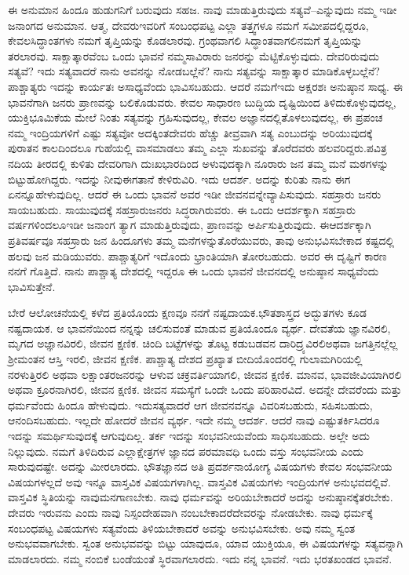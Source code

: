 ಈ ಅನುಮಾನ ಹಿಂದೂ ಹುಡುಗನಿಗೆ ಬರುವುದು ಸಹಜ. ನಾವು ಮಾಡುತ್ತಿರುವುದು ಸತ್ಯವೆ–ಎನ್ನುವುದು ನಮ್ಮ ಇಡೀ ಜನಾಂಗದ ಅನುಮಾನ. ಆತ್ಮ, ದೇವರು\break ಇವರಿಗೆ ಸಂಬಂಧಪಟ್ಟ ಎಲ್ಲಾ ತತ್ತ್ವಗಳೂ ನಮಗೆ ಸಮೀಪದಲ್ಲಿದ್ದರೂ, ಕೇವಲ\break ಸಿದ್ಧಾಂತಗಳು ನಮಗೆ ತೃಪ್ತಿಯನ್ನು ಕೊಡಲಾರವು. ಗ್ರಂಥವಾಗಲಿ ಸಿದ್ಧಾಂತವಾಗಲಿ\break ನಮಗೆ ತೃಪ್ತಿಯನ್ನು ತರಲಾರವು. ಸಾಕ್ಷಾತ್ಕಾರವೆಂಬ ಒಂದು ಭಾವನೆ ನಮ್ಮ\break ಸಾವಿರಾರು ಜನರನ್ನು ಮೆಟ್ಟಿಕೊಳ್ಳುವುದು. ದೇವರಿರುವುದು ಸತ್ಯವೆ? ಇದು ಸತ್ಯವಾದರೆ ನಾನು ಅವನನ್ನು ನೋಡಬಲ್ಲೆನೆ? ನಾನು ಸತ್ಯವನ್ನು ಸಾಕ್ಷಾತ್ಕಾರ ಮಾಡಿಕೊಳ್ಳಬಲ್ಲೆನೆ? ಪಾಶ್ಚಾತ್ಯರು ಇದನ್ನು ಕಾರ್ಯತಃ ಅಸಾಧ್ಯವೆಂದು ಭಾವಿಸಬಹುದು. ಆದರೆ ನಮಗೆ\break ಇದು ಅಕ್ಷರಶಃ ಅನುಷ್ಠಾನ ಸಾಧ್ಯ. ಈ ಭಾವನೆಗಾಗಿ ಜನರು ಪ್ರಾಣವನ್ನು ಬಲಿಕೊಡುವರು. ಕೇವಲ ಸಾಧಾರಣ ಬುದ್ಧಿಯ ದೃಷ್ಟಿಯಿಂದ ತಿಳಿದುಕೊಳ್ಳುವುದಲ್ಲ, ಯುಕ್ತಿ\break ಭೂಮಿಕೆಯ ಮೇಲೆ ನಿಂತು ಸತ್ಯವನ್ನು ಗ್ರಹಿಸುವುದಲ್ಲ, ಕೇವಲ ಅಜ್ಞಾನದಲ್ಲಿ\break ತೊಳಲುವುದಲ್ಲ, ಈ ಪ್ರಪಂಚ ನಮ್ಮ ಇಂದ್ರಿಯಗಳಿಗೆ ಎಷ್ಟು ಸತ್ಯವೋ ಅದಕ್ಕಿಂತ\break ದೇವರು ಹೆಚ್ಚು ತೀವ್ರವಾಗಿ ಸತ್ಯ ಎಂಬುದನ್ನು ಅರಿಯುವುದಕ್ಕೆ ಪುರಾತನ ಕಾಲದಿಂದಲೂ ಗುಹೆಯಲ್ಲಿ ವಾಸಮಾಡಲು ತಮ್ಮ ಎಲ್ಲಾ ಸುಖವನ್ನು ತೊರೆದವರು ಹಲವರಿದ್ದರು.\break ಪವಿತ್ರ ನದಿಯ ತೀರದಲ್ಲಿ ಕುಳಿತು ದೇವರಿಗಾಗಿ ದುಃಖಭಾರದಿಂದ ಅಳುವುದಕ್ಕಾಗಿ ನೂರಾರು ಜನ ತಮ್ಮ ಮನೆ ಮಠಗಳನ್ನು ಬಿಟ್ಟುಹೋಗಿದ್ದರು. ಇದನ್ನು ನೀವು\break ಈಗತಾನೆ ಕೇಳಿರುವಿರಿ. ಇದು ಆದರ್ಶ. ಅದನ್ನು ಕುರಿತು ನಾನು ಈಗ ಏನನ್ನೂ\break ಹೇಳುವುದಿಲ್ಲ. ಆದರೆ ಈ ಒಂದು ಭಾವನೆ ಅವರ ಇಡೀ ಜೀವನವನ್ನೇ\break ವ್ಯಾಪಿಸುವುದು. ಸಹಸ್ರಾರು ಜನರು ಸಾಯಬಹುದು. ಸಾಯುವುದಕ್ಕೆ ಸಹಸ್ರಾರು\break ಜನರು ಸಿದ್ಧರಾಗಿರುವರು. ಈ ಒಂದು ಆದರ್ಶಕ್ಕಾಗಿ ಸಹಸ್ರಾರು ವರ್ಷಗಳಿಂದಲೂ\break ಇಡೀ ಜನಾಂಗ ತ್ಯಾಗ ಮಾಡುತ್ತಿರುವುದು, ಪ್ರಾಣವನ್ನು ಅರ್ಪಿಸುತ್ತಿರುವುದು. ಈ\break ಆದರ್ಶಕ್ಕಾಗಿ ಪ್ರತಿವರ್ಷವೂ ಸಹಸ್ರಾರು ಜನ ಹಿಂದೂಗಳು ತಮ್ಮ ಮನೆಗಳನ್ನು\break ತೊರೆಯುವರು, ತಾವು ಅನುಭವಿಸಬೇಕಾದ ಕಷ್ಟದಲ್ಲಿ ಹಲವು ಜನ ಮಡಿಯುವರು. ಪಾಶ್ಚಾತ್ಯರಿಗೆ ಇದೊಂದು ಭ್ರಾಂತಿಯಾಗಿ ತೋರಬಹುದು. ಅವರ ಈ ದೃಷ್ಟಿಗೆ ಕಾರಣ ನನಗೆ ಗೊತ್ತಿದೆ. ನಾನು ಪಾಶ್ಚಾತ್ಯ ದೇಶದಲ್ಲಿ ಇದ್ದರೂ ಈ ಒಂದು ಭಾವನೆ ಜೀವನದಲ್ಲಿ ಅನುಷ್ಠಾನ ಸಾಧ್ಯವೆಂದು ಭಾವಿಸುತ್ತೇನೆ.

ಬೇರೆ ಆಲೋಚನೆಯಲ್ಲಿ ಕಳೆದ ಪ್ರತಿಯೊಂದು ಕ್ಷಣವೂ ನನಗೆ ನಷ್ಟದಾಯಕ.\break ಭೌತಶಾಸ್ತ್ರದ ಅದ್ಭುತಗಳು ಕೂಡ ನಷ್ಟದಾಯಕ. ಆ ಭಾವನೆಯಿಂದ ನನ್ನನ್ನು ಚಲಿಸುವಂತೆ ಮಾಡುವ ಪ್ರತಿಯೊಂದೂ ವ್ಯರ್ಥ. ದೇವತೆಯ ಜ್ಞಾನವಿರಲಿ, ಮೃಗದ ಅಜ್ಞಾನವಿರಲಿ, ಜೀವನ ಕ್ಷಣಿಕ. ಚಿಂದಿ ಬಟ್ಟೆಗಳನ್ನು ತೊಟ್ಟ ಕಡುಬಡವನ ದಾರಿದ್ರ್ಯವಿರಲಿ\break ಅಥವಾ ಜಗತ್ತಿನಲ್ಲೆಲ್ಲ ಶ‍್ರೀಮಂತನ ಆಸ್ತಿ ಇರಲಿ, ಜೀವನ ಕ್ಷಣಿಕ. ಪಾಶ್ಚಾತ್ಯ ದೇಶದ ಪ್ರಖ್ಯಾತ ಬೀದಿಯೊಂದರಲ್ಲಿ ಗುಲಾಮಗಿರಿಯಲ್ಲಿ ನರಳುತ್ತಿರಲಿ ಅಥವಾ ಲಕ್ಷಾಂತರ\break ಜನರನ್ನು ಆಳುವ ಚಕ್ರವರ್ತಿಯಾಗಲಿ, ಜೀವನ ಕ್ಷಣಿಕ. ಮಾನವ, ಭಾವಜೀವಿ\-ಯಾಗಿರಲಿ ಅಥವಾ ಕ್ರೂರನಾಗಿರಲಿ, ಜೀವನ ಕ್ಷಣಿಕ. ಜೀವನ ಸಮಸ್ಯೆಗೆ ಒಂದೇ ಒಂದು ಪರಿಹಾರವಿದೆ. ಅದನ್ನೇ ದೇವರೆಂದು ಮತ್ತು ಧರ್ಮವೆಂದು ಹಿಂದೂ ಹೇಳುವುದು. ಇದು\break ಸತ್ಯವಾದರೆ ಆಗ ಜೀವನವನ್ನೂ ವಿವರಿಸಬಹುದು, ಸಹಿಸಬಹುದು, ಆನಂದಿಸಬಹುದು. ಇಲ್ಲದೇ ಹೋದರೆ ಜೀವನ ವ್ಯರ್ಥ. ಇದೇ ನಮ್ಮ ಆದರ್ಶ. ಆದರೆ ನಾವು ಎಷ್ಟು\break ತರ್ಕಿಸಿದರೂ ಇದನ್ನು ಸಮರ್ಥಿಸುವುದಕ್ಕೆ ಆಗುವುದಿಲ್ಲ. ತರ್ಕ ಇದನ್ನು ಸಂಭವನೀಯವೆಂದು ಸಾಧಿಸಬಹುದು. ಅಲ್ಲೇ ಅದು ನಿಲ್ಲುವುದು. ನಮಗೆ ತಿಳಿದಿರುವ ಎಲ್ಲಾ\break ಕ್ಷೇತ್ರಗಳ ಜ್ಞಾನದ ಪರಮಾವಧಿ ಒಂದು ವಸ್ತು ಸಂಭವನೀಯ ಎಂದು ಸಾರುವುದಷ್ಟೇ. ಅದನ್ನು ಮೀರಲಾರದು. ಭೌತಜ್ಞಾನದ ಅತಿ ಪ್ರದರ್ಶನಾಯೋಗ್ಯ ವಿಷಯಗಳು ಕೇವಲ ಸಂಭವನೀಯ ವಿಷಯಗಳಲ್ಲದೆ ಅವು ಇನ್ನೂ ವಾಸ್ತವಿಕ ವಿಷಯಗಳಾಗಿಲ್ಲ. ವಾಸ್ತವಿಕ ವಿಷಯಗಳು ಇಂದ್ರಿಯಗಳ ಅನುಭವದಲ್ಲಿವೆ. ವಾಸ್ತವಿಕ ಸ್ಥಿತಿಯನ್ನು ನಾವು\break ಮನಗಾಣಬೇಕು. ನಾವು ಧರ್ಮವನ್ನು ಅರಿಯಬೇಕಾದರೆ ಅದನ್ನು ಅನುಷ್ಠಾನಕ್ಕೆ\break ತರಬೇಕು. ದೇವರು ಇರುವನು ಎಂದು ನಾವು ನಿಸ್ಸಂದೇಹವಾಗಿ ನಂಬಬೇಕಾದರೆ\break ದೇವರನ್ನು ನೋಡಬೇಕು. ನಾವು ಧರ್ಮಕ್ಕೆ ಸಂಬಂಧಪಟ್ಟ ವಿಷಯಗಳು ಸತ್ಯವೆಂದು ತಿಳಿಯಬೇಕಾದರೆ ಅವನ್ನು ಅನುಭವಿಸಬೇಕು. ಅವು ನಮ್ಮ ಸ್ವಂತ ಅನುಭವವಾಗಬೇಕು. ಸ್ವಂತ ಅನುಭವವನ್ನು ಬಿಟ್ಟು ಯಾವುದೂ, ಯಾವ ಯುಕ್ತಿಯೂ, ಈ ವಿಷಯಗಳನ್ನು ಸತ್ಯವನ್ನಾಗಿ ಮಾಡಲಾರದು. ನಮ್ಮ ನಂಬಿಕೆ ಬಂಡೆಯಂತೆ ಸ್ಥಿರವಾಗಲಾರದು. ಇದು ನನ್ನ ಭಾವನೆ. ಇದು ಭರತಖಂಡದ ಭಾವನೆ.

